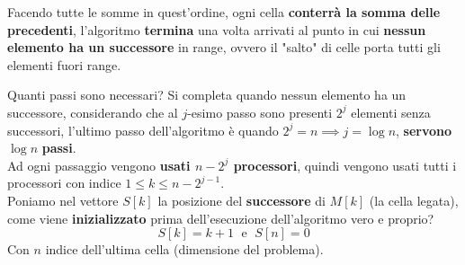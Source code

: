 \begin{center}
\end{center}

Facendo tutte le somme in quest'ordine, ogni cella \textbf{conterrà la somma delle precedenti}, l'algoritmo \textbf{termina} una volta arrivati al punto in cui \textbf{nessun elemento ha un successore} in range, ovvero il "salto" di celle porta tutti gli elementi fuori range.\\

\newpage

Quanti passi sono necessari? Si completa quando nessun elemento ha un successore, considerando che al $j$-esimo passo sono presenti $2^j$ elementi senza successori, l'ultimo passo dell'algoritmo è quando $2^j = n \implies j = \log n$, \textbf{servono} $\log n$ \textbf{passi}.\\

Ad ogni passaggio vengono \textbf{usati $n-2^j$ processori}, quindi vengono usati tutti i processori con indice $1 \leq k \leq n - 2^{j-1}$.\\

Poniamo nel vettore $S[k]$ la posizione del \textbf{successore} di $M[k]$ (la cella legata), come viene \textbf{inizializzato} prima dell'esecuzione dell'algoritmo vero e proprio?
$$S[k] = k+1 \; \text{ e } \; S[n] = 0$$
Con $n$ indice dell'ultima cella (dimensione del problema).\\

